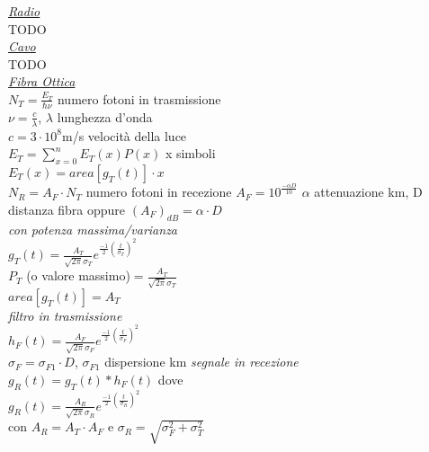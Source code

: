 \documentclass[a4paper]{article}
\begin{document}
\begin{multicols*}{3}
\underline{\textit{Radio}} \\
TODO \\
\underline{\textit{Cavo}} \\
TODO \\
\underline{\textit{Fibra Ottica}} \\
$N_T = \frac{E_T}{\hbar\nu}$ numero fotoni in trasmissione \\
$\nu = \frac{c}{\lambda}$, $\lambda$ lunghezza d'onda \\
$c=3\cdot10^8$m/s  velocità della luce \\
$E_T = \sum_{x=0}^{n}{E_T(x)P(x)}$ x simboli \\
$E_T(x) = area[g_T(t)]\cdot x$ \\
$N_R = A_F\cdot N_T$ numero fotoni in recezione
$A_F = 10^{\frac{-\alpha D}{10}}$ $\alpha$ attenuazione km, D distanza fibra
oppure ${(A_F)}_{dB}=\alpha\cdot D$ \\ 
\textit{con potenza massima/varianza }\\
$g_T(t)=\frac{A_T}{\sqrt{2\pi}\sigma_T}e^{\frac{-1}{2}{(\frac{t}{\sigma_T})}^{2}}$
\\ $P_T$ (o valore massimo)$=\frac{A_T}{\sqrt{2\pi}\sigma_T}$ \\
$area[g_T(t)] = A_T$ \\
\textit{filtro in trasmissione }\\
$h_F(t)=\frac{A_F}{\sqrt{2\pi}\sigma_F}e^{\frac{-1}{2}{(\frac{t}{\sigma_F})}^{2}}$ \\
$\sigma_F=\sigma_{F1} \cdot D$, $\sigma_{F1}$ dispersione km
\textit{segnale in recezione}\\ 
$g_R(t)=g_T(t)*h_F(t)$ dove \\
$g_R(t)=\frac{A_R}{\sqrt{2\pi}\sigma_R}e^{\frac{-1}{2}{(\frac{t}{\sigma_R})}^{2}}$
\\ con $A_R = A_T \cdot A_F$ e $\sigma_R = \sqrt{\sigma_F^2 + \sigma_T^2}$
\end{multicols*}
\end{document}
